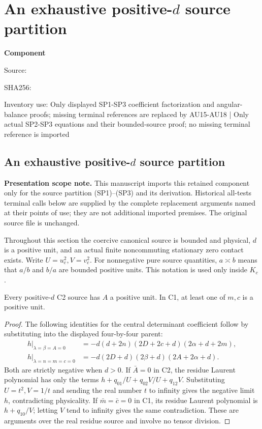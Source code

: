 \chapter{An exhaustive positive-$d$ source partition}
\label{component:pfb270019c56f}
\noindent\textbf{Component }\par
{\small\noindent Source: \par}
{\small\noindent SHA256: \par}
{\small\noindent Inventory use: Only displayed SP1-SP3 coefficient factorization and angular-balance proofs; missing terminal references are replaced by AU15-AU18 | Only actual SP2-SP3 equations and their bounded-source proof; no missing terminal reference is imported\par}
\medskip
\section{An exhaustive positive-$d$ source partition}
\label{pfb270019c56f:sec:positive-d-source-partition}

\noindent\textbf{Presentation scope note.} This manuscript imports this retained component only for the source partition (SP1)--(SP3) and its derivation. Historical all-tests terminal calls below are supplied by the complete replacement arguments named at their points of use; they are not additional imported premises. The original source file is unchanged.


Throughout this section the coercive canonical source is bounded and physical,
$d$ is a positive unit, and an actual finite noncommuting stationary
zero contact exists. Write $U=u_c^2,V=v_c^2$. For nonnegative pure
source quantities, $a\asymp b$ means that $a/b$ and $b/a$ are bounded
positive units. This notation is used only inside $K_c$.

\begin{lemma}
\label{pfb270019c56f:lem:positive-d-forbidden-faces}
Every positive-$d$ C2 source has $A$ a positive unit. In C1, at least
one of $m,c$ is a positive unit.
\end{lemma}
\begin{proof}
The following identities for the central determinant coefficient
follow by substituting into the displayed four-by-four parent:
\begin{align*}
 h\big|_{\lambda=\beta=A=0}
 &=-d(d+2n)(2D+2c+d)(2\alpha+d+2m),\\
 h\big|_{\lambda=n=m=c=0}
 &=-d(2D+d)(2\beta+d)(2A+2\alpha+d).
\end{align*}
Both are strictly negative when $d>0$. If $\bar A=0$ in C2,
the residue Laurent polynomial has only the terms
$h+q_{01}/U+q_{02}V/U+q_{12}V$. Substituting $U=t^2,V=1/t$
and sending the real number $t$ to infinity gives the negative limit
$h$, contradicting physicality. If $\bar m=\bar c=0$ in C1,
its residue Laurent polynomial is $h+q_{10}/V$; letting $V$ tend to
infinity gives the same contradiction. These are arguments over the
real residue source and involve no tensor division.
\end{proof}

